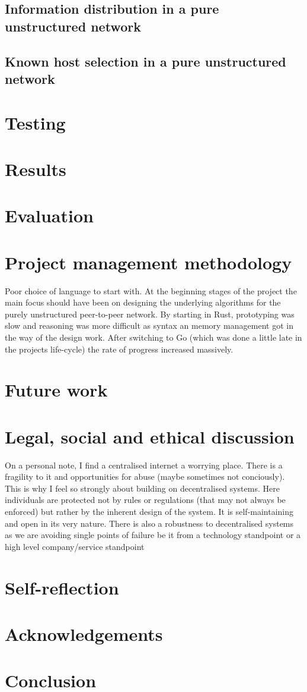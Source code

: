 \documentclass[a4paper]{article}
\begin{document}
\subsection{Information distribution in a pure unstructured network}
\subsection{Known host selection in a pure unstructured network}

\section{Testing}

\section{Results}

\section{Evaluation}

\section{Project management methodology} %
Poor choice of language to start with. At the beginning stages of the project the main focus should have been on designing the underlying algorithms for the purely unstructured peer-to-peer network. By starting in Rust, prototyping was slow and reasoning was more difficult as syntax an memory management got in the way of the design work. After switching to Go (which was done a little late in the projects life-cycle) the rate of progress increased massively.

\section{Future work}

\section{Legal, social and ethical discussion}
On a personal note, I find a centralised internet a worrying place. There is a fragility to it and opportunities for abuse (maybe sometimes not conciously). This is why I feel so strongly about building on decentralised systems. Here individuals are protected not by rules or regulations (that may not always be enforced) but rather by the inherent design of the system. It is self-maintaining and open in its very nature. There is also a robustness to decentralised systems as we are avoiding single points of failure be it from a technology standpoint or a high level company/service standpoint
\section{Self-reflection}
\section{Acknowledgements}
\section{Conclusion}

\end{document}
